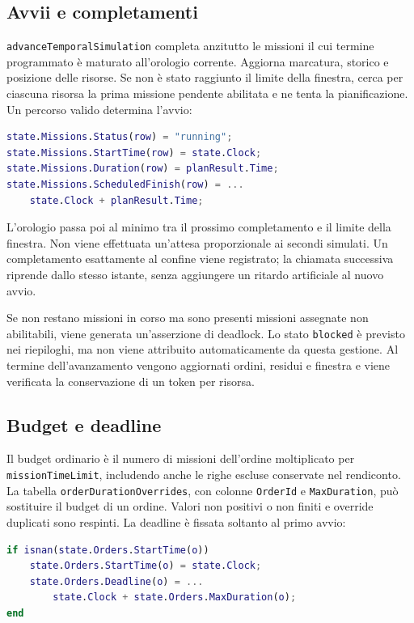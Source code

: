 \subsection{Avvii e completamenti}

\texttt{advanceTemporalSimulation} completa anzitutto le missioni il cui
termine programmato è maturato all'orologio corrente. Aggiorna marcatura,
storico e posizione delle risorse. Se non è stato raggiunto il limite della
finestra, cerca per ciascuna risorsa la prima missione pendente abilitata e
ne tenta la pianificazione. Un percorso valido determina l'avvio:

\begin{lstlisting}[language=Matlab,caption={Registrazione dei tempi all'avvio della missione.},label={lst:impl-avvio}]
state.Missions.Status(row) = "running";
state.Missions.StartTime(row) = state.Clock;
state.Missions.Duration(row) = planResult.Time;
state.Missions.ScheduledFinish(row) = ...
    state.Clock + planResult.Time;
\end{lstlisting}

L'orologio passa poi al minimo tra il prossimo completamento e il limite
della finestra. Non viene effettuata un'attesa proporzionale ai secondi
simulati. Un completamento esattamente al confine viene registrato; la
chiamata successiva riprende dallo stesso istante, senza aggiungere un
ritardo artificiale al nuovo avvio.

Se non restano missioni in corso ma sono presenti missioni assegnate non
abilitabili, viene generata un'asserzione di deadlock. Lo stato
\texttt{blocked} è previsto nei riepiloghi, ma non viene attribuito
automaticamente da questa gestione. Al termine dell'avanzamento vengono
aggiornati ordini, residui e finestra e viene verificata la conservazione
di un token per risorsa.

\subsection{Budget e deadline}

Il budget ordinario è il numero di missioni dell'ordine moltiplicato per
\texttt{missionTimeLimit}, includendo anche le righe escluse conservate
nel rendiconto. La tabella \texttt{orderDurationOverrides}, con colonne
\texttt{OrderId} e \texttt{MaxDuration}, può sostituire il budget di un
ordine. Valori non positivi o non finiti e override duplicati sono respinti.
La deadline è fissata soltanto al primo avvio:

\begin{lstlisting}[language=Matlab,caption={Definizione della deadline all'avvio effettivo.},label={lst:impl-deadline}]
if isnan(state.Orders.StartTime(o))
    state.Orders.StartTime(o) = state.Clock;
    state.Orders.Deadline(o) = ...
        state.Clock + state.Orders.MaxDuration(o);
end
\end{lstlisting}

